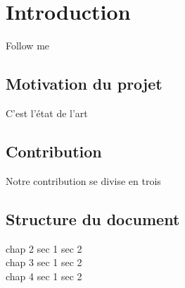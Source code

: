 \setcounter{page}{1}
\chapter{Introduction}
\label{chapter/introduction}

Follow me

	\section{Motivation du projet}
	\label{section/motivation}
	
	C'est l'état de l'art
	
	\section{Contribution}
	\label{section/contribution}
	
	Notre contribution se divise en trois
	
	\section{Structure du document}
	\label{section/document_structure}
	
	chap 2 sec 1 sec 2 \\
	chap 3 sec 1 sec 2 \\
	chap 4 sec 1 sec 2 \\